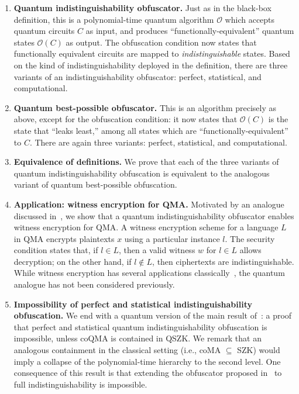 \documentclass[11pt]{article}
\numberwithin{equation}{section}
\newcommand{\algo}{\mathcal}
\begin{document}
{\begin{enumerate}
\item \textbf{Quantum indistinguishability obfuscator.} Just as in the black-box definition, this is a polynomial-time quantum algorithm $\algo O$ which accepts quantum circuits $C$ as input, and produces ``functionally-equivalent'' quantum states $\algo O(C)$ as output. The obfuscation condition now states that functionally equivalent circuits are mapped to \emph{indistinguishable} states. Based on the kind of indistinguishability deployed in the definition, there are three variants of an indistinguishability obfuscator: perfect, statistical, and computational.
\item \textbf{Quantum best-possible obfuscator.} This is an algorithm precisely as above, except for the obfuscation condition: it now states that $\algo O(C)$ is the state that ``leaks least,'' among all states which are ``functionally-equivalent'' to $C$. There are again three variants: perfect, statistical, and computational.
\item \textbf{Equivalence of definitions.} We prove that each of the three variants of quantum indistinguishability obfuscation is equivalent to the analogous variant of quantum best-possible obfuscation.
\item \textbf{Application: witness encryption for QMA.} Motivated by an analogue discussed in~\cite{GGSW13, GGHRSW13}, we show that a quantum indistinguishability obfuscator enables witness encryption for QMA. A witness encryption scheme for a language $L$ in QMA encrypts plaintexts $x$ using a particular instance $l$. The security condition states that, if $l \in L$, then a valid witness $w$ for $l \in L$ allows decryption; on the other hand, if $l \notin L$, then ciphertexts are indistinguishable. While witness encryption has several applications classically~\cite{GGSW13}, the quantum analogue has not been considered previously.
\item \textbf{Impossibility of perfect and statistical indistinguishability obfuscation.} We end with a quantum version of the main result of~\cite{GR07}: a proof that perfect and statistical quantum indistinguishability obfuscation is impossible, unless coQMA is contained in QSZK. We remark that an analogous containment in the classical setting (i.e., coMA $\subseteq$ SZK) would imply a collapse of the polynomial-time hierarchy to the second level. One consequence of this result is that extending the obfuscator proposed in~\cite{ASS14} to full indistinguishability is impossible.
\end{enumerate}

}
\end{document}
